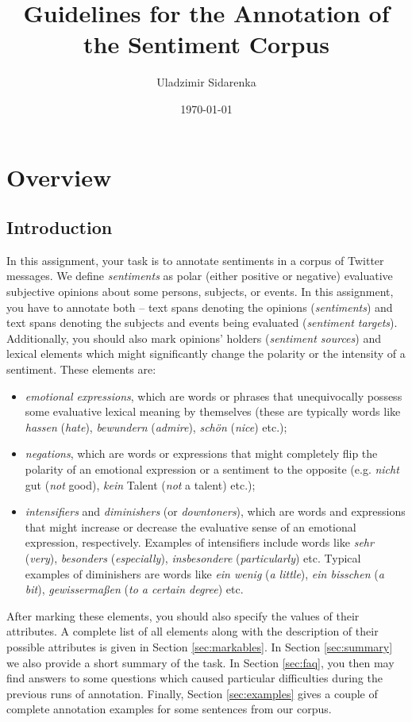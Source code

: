 \documentclass[11pt,a4paper]{article}
\author{Uladzimir Sidarenka}
\date{\today}
\title{Guidelines for the Annotation of the Sentiment Corpus}
\theoremstyle{mytheoremstyle}
\begin{document}
\maketitle{}
\section{Overview}
\subsection{Introduction}

In this assignment, your task is to annotate sentiments in a corpus of
Twitter messages.  We define \emph{sentiments} as polar (either
positive or negative) evaluative subjective opinions about some
persons, subjects, or events.  In this assignment, you have to
annotate both -- text spans denoting the opinions (\emph{sentiments})
and text spans denoting the subjects and events being evaluated
(\emph{sentiment targets}).  Additionally, you should also mark
opinions' holders (\emph{sentiment sources}) and lexical elements
which might significantly change the polarity or the intensity of a
sentiment.  These elements are:
\begin{itemize}
  \item \emph{emotional expressions}, which are words or phrases that
    unequivocally possess some evaluative lexical meaning by
    themselves (these are typically words like \emph{hassen}
    (\emph{hate}), \emph{bewundern} (\emph{admire}), \emph{sch\"on}
    (\emph{nice}) etc.);
  \item \emph{negations}, which are words or expressions that might
    completely flip the polarity of an emotional expression or a
    sentiment to the opposite (e.g. \emph{nicht} gut (\emph{not}
    good), \emph{kein} Talent (\emph{not} a talent) etc.);
  \item \emph{intensifiers} and \emph{diminishers} (or
    \emph{downtoners}), which are words and expressions that might
    increase or decrease the evaluative sense of an emotional
    expression, respectively.  Examples of intensifiers include words
    like \emph{sehr} (\emph{very}), \emph{besonders}
    (\emph{especially}), \emph{insbesondere} (\emph{particularly})
    etc.  Typical examples of diminishers are words like \emph{ein
      wenig} (\emph{a little}), \emph{ein bisschen} (\emph{a bit}),
    \emph{gewisserma\ss{}en} (\emph{to a certain degree}) etc.
\end{itemize}

After marking these elements, you should also specify the values of
their attributes.  A complete list of all elements along with the
description of their possible attributes is given in Section
\ref{sec:markables}.  In Section \ref{sec:summary} we also provide a
short summary of the task.  In Section \ref{sec:faq}, you then may
find answers to some questions which caused particular difficulties
during the previous runs of annotation.  Finally, Section
\ref{sec:examples} gives a couple of complete annotation examples for
some sentences from our corpus.
\end{document}
